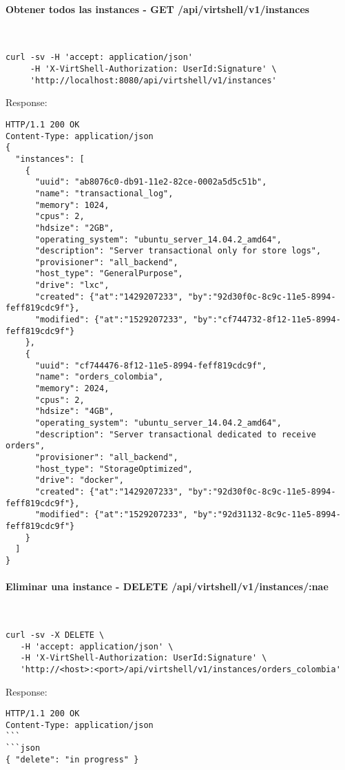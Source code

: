 \paragraph{Obtener todos las instances - GET /api/virtshell/v1/instances} ~\\

\begin{lstlisting}[style=json]
curl -sv -H 'accept: application/json' 
     -H 'X-VirtShell-Authorization: UserId:Signature' \ 
     'http://localhost:8080/api/virtshell/v1/instances'
\end{lstlisting}

Response:

\begin{lstlisting}[style=json]
HTTP/1.1 200 OK
Content-Type: application/json
{
  "instances": [
    {
      "uuid": "ab8076c0-db91-11e2-82ce-0002a5d5c51b",
      "name": "transactional_log",
      "memory": 1024,
      "cpus": 2,
      "hdsize": "2GB",
      "operating_system": "ubuntu_server_14.04.2_amd64",
      "description": "Server transactional only for store logs", 
      "provisioner": "all_backend",
      "host_type": "GeneralPurpose",
      "drive": "lxc",
      "created": {"at":"1429207233", "by":"92d30f0c-8c9c-11e5-8994-feff819cdc9f"},
      "modified": {"at":"1529207233", "by":"cf744732-8f12-11e5-8994-feff819cdc9f"}
    },
    { 
      "uuid": "cf744476-8f12-11e5-8994-feff819cdc9f",
      "name": "orders_colombia",
      "memory": 2024,
      "cpus": 2,
      "hdsize": "4GB",
      "operating_system": "ubuntu_server_14.04.2_amd64",
      "description": "Server transactional dedicated to receive orders", 
      "provisioner": "all_backend",
      "host_type": "StorageOptimized",
      "drive": "docker",
      "created": {"at":"1429207233", "by":"92d30f0c-8c9c-11e5-8994-feff819cdc9f"},
      "modified": {"at":"1529207233", "by":"92d31132-8c9c-11e5-8994-feff819cdc9f"}
    }    
  ]
} 
\end{lstlisting}

\paragraph{Eliminar una instance - DELETE /api/virtshell/v1/instances/:nae} ~\\

\begin{lstlisting}[style=json]
curl -sv -X DELETE \
   -H 'accept: application/json' \
   -H 'X-VirtShell-Authorization: UserId:Signature' \
   'http://<host>:<port>/api/virtshell/v1/instances/orders_colombia'
\end{lstlisting}

Response:

\begin{lstlisting}[style=json]
HTTP/1.1 200 OK
Content-Type: application/json
```
```json
{ "delete": "in progress" }
\end{lstlisting}